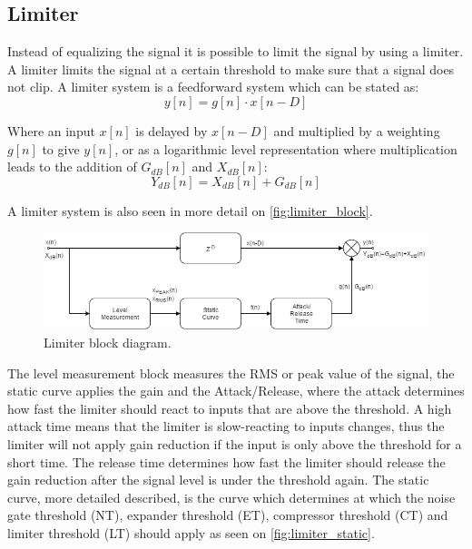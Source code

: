 \subsection*{Limiter}
Instead of equalizing the signal it is possible to limit the signal by using a limiter. A limiter limits the signal at a certain threshold to make sure that a signal does not clip. A limiter system is a feedforward system which can be stated as:
\begin{equation}
y[n] = g[n]\cdot x[n-D]
\end{equation}

Where an input $x[n]$ is delayed by $x[n-D]$ and multiplied by a weighting $g[n]$ to give $y[n]$, or as a logarithmic level representation where multiplication leads to the addition of $G_{dB}[n]$ and $X_{dB}[n]$:
\begin{equation}
Y_{dB}[n] = X_{dB}[n] + G_{dB}[n]
\end{equation}

A limiter system is also seen in more detail on \autoref{fig:limiter_block}.

\begin{figure}[H]
\centering
\includegraphics[width=1\textwidth]{figures/Limiter_block.png}
\caption{Limiter block diagram.}
\label{fig:limiter_block}
\end{figure}   


The level measurement block measures the RMS or peak value of the signal, the static curve applies the gain and the Attack/Release, where the attack determines how fast the limiter should react to inputs that are above the threshold. A high attack time means that the limiter is slow-reacting to inputs changes, thus the limiter will not apply gain reduction if the input is only above the threshold for a short time. The release time determines how fast the limiter should release the gain reduction after the signal level is under the threshold again.
The static curve, more detailed described, is the curve which determines at which the noise gate threshold (NT), expander threshold (ET), compressor threshold (CT) and limiter threshold (LT) should apply as seen on \autoref{fig:limiter_static}. 

